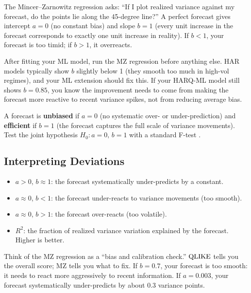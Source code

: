 \begin{intuition}
The Mincer--Zarnowitz regression asks: ``If I plot realized variance against my forecast, do the points lie along the 45-degree line?''
A perfect forecast gives intercept $a = 0$ (no constant bias) and slope $b = 1$ (every unit increase in the forecast corresponds to exactly one unit increase in reality).
If $b < 1$, your forecast is too timid; if $b > 1$, it overreacts.
\end{intuition}

\begin{projectconnection}
After fitting your ML model, run the MZ regression before anything else.
HAR models typically show $b$ slightly below 1 (they smooth too much in high-vol regimes), and your ML extension should fix this.
If your HARQ-ML model still shows $b = 0.85$, you know the improvement needs to come from making the forecast more reactive to recent variance spikes, not from reducing average bias.
\end{projectconnection}

\begin{definition}
A forecast is \textbf{unbiased} if $a = 0$ (no systematic over- or under-prediction) and \textbf{efficient} if $b = 1$ (the forecast captures the full scale of variance movements).
Test the joint hypothesis $H_0: a = 0, \, b = 1$ with a standard F-test \citep{MincerZarnowitz1969}.
\end{definition}

\subsection{Interpreting Deviations}

\begin{itemize}[nosep]
  \item $a > 0$, $b \approx 1$: the forecast systematically under-predicts by a constant.
  \item $a \approx 0$, $b < 1$: the forecast under-reacts to variance movements (too smooth).
  \item $a \approx 0$, $b > 1$: the forecast over-reacts (too volatile).
  \item $R^2$: the fraction of realized variance variation explained by the forecast. Higher is better.
\end{itemize}

\begin{intuition}
Think of the MZ regression as a ``bias and calibration check.''
$\operatorname{QLIKE}$ tells you the overall score; MZ tells you what to fix.
If $b = 0.7$, your forecast is too smooth: it needs to react more aggressively to recent information.
If $a = 0.003$, your forecast systematically under-predicts by about 0.3 variance points.
\end{intuition}

